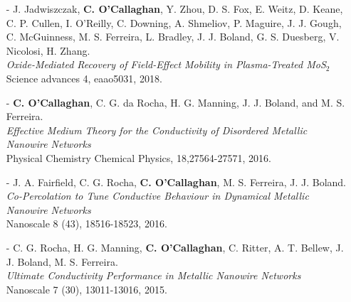 \begin{itemize}
 \item[-] J. Jadwiszczak, \textbf{C. O'Callaghan}, Y. Zhou, D. S. Fox, E. Weitz, D. Keane, C. P. Cullen, I. O'Reilly, C. Downing, A. Shmeliov, P. Maguire, J. J. Gough, C. McGuinness, M. S. Ferreira, L. Bradley, J. J. Boland, G. S. Duesberg, V. Nicolosi, H. Zhang. \\
 \emph{Oxide-Mediated Recovery of Field-Effect Mobility in Plasma-Treated MoS$_2$} \\ 
 Science advances 4, eaao5031, 2018.
\end{itemize}

\begin{itemize}
 \item[-] \textbf{C. O'Callaghan}, C. G. da Rocha, H. G. Manning, J. J. Boland, and M. S. Ferreira.\\
 \emph{Effective Medium Theory for the Conductivity of Disordered Metallic Nanowire Networks} \\ 
 Physical Chemistry Chemical Physics, 18,27564-27571, 2016.
\end{itemize}

\begin{itemize}
 \item[-] J. A. Fairfield, C. G. Rocha, \textbf{C. O'Callaghan}, M. S. Ferreira, J. J. Boland. \\
 \emph{Co-Percolation to Tune Conductive Behaviour in Dynamical Metallic Nanowire Networks} \\ 
 Nanoscale 8 (43), 18516-18523, 2016.
\end{itemize}

\begin{itemize}
 \item[-] C. G. Rocha, H. G. Manning, \textbf{C. O'Callaghan}, C. Ritter, A. T. Bellew, J. J. Boland, M. S. Ferreira. \\
 \emph{Ultimate Conductivity Performance in Metallic Nanowire Networks} \\ 
 Nanoscale 7 (30), 13011-13016, 2015.
\end{itemize}

